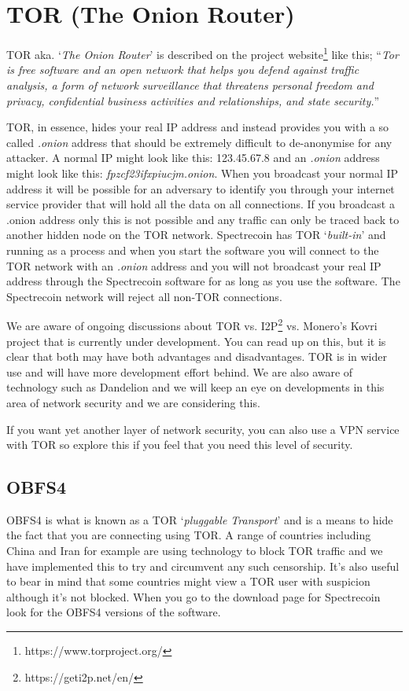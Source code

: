 \section{TOR (The Onion Router)}
TOR aka. ‘\textit{The Onion Router}’ is described on the project
website\footnote{https://www.torproject.org/ } like this; “\textit{Tor is
free software and an open network that helps you defend against traffic
analysis, a form of network surveillance that threatens personal freedom
and privacy, confidential business activities and relationships, and
state security.}”



TOR, in essence, hides your real IP address and instead provides you with
a so called \textit{.onion} address that should be extremely difficult to
de-anonymise for any attacker. A normal IP might look like this: 123.45.67.8
and an \textit{.onion} address might look like this:
\textit{fpzcf23ifxpiucjm.onion}. When you broadcast your normal IP address
it will be possible for an adversary to identify you through your internet
service provider that will hold all the data on all connections. If you
broadcast a .onion address only this is not possible and any traffic can
only be traced back to another hidden node on the TOR network. Spectrecoin
has TOR ‘\textit{built-in}’ and running as a process and when you start the
software you will connect to the TOR network with an \textit{.onion} address
and you will not broadcast your real IP address through the Spectrecoin
software for as long as you use the software. The Spectrecoin network will
reject all non-TOR connections.



We are aware of ongoing discussions about TOR vs. I2P\footnote{https://geti2p.net/en/}
vs. Monero’s Kovri project that is currently under development. You can
read up on this, but it is clear that both may have both advantages and
disadvantages. TOR is in wider use and will have more development effort
behind. We are also aware of technology such as Dandelion and we will keep
an eye on developments in this area of network security and we are
considering this.



If you want yet another layer of network security, you can also use a VPN
service with TOR so explore this if you feel that you need this level of
security.


\subsection{OBFS4}
OBFS4 is what is known as a TOR ‘\textit{pluggable Transport}’ and is a
means to hide the fact that you are connecting using TOR. A range of
countries including China and Iran for example are using technology to
block TOR traffic and we have implemented this to try and circumvent any
such censorship. It’s also useful to bear in mind that some countries might
view a TOR user with suspicion although it’s not blocked. When you go to
the download page for Spectrecoin look for the OBFS4 versions of the
software.



